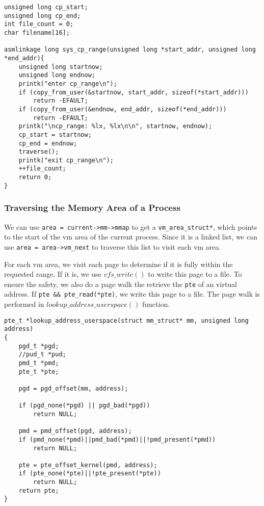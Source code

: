 \documentclass[11pt]{article}
\begin{document}
\begin{lstlisting}[style=CStyle]
unsigned long cp_start;
unsigned long cp_end;
int file_count = 0;
char filename[16];

asmlinkage long sys_cp_range(unsigned long *start_addr, unsigned long *end_addr){
    unsigned long startnow;
    unsigned long endnow;
    printk("enter cp_range\n");
    if (copy_from_user(&startnow, start_addr, sizeof(*start_addr)))
        return -EFAULT;
    if (copy_from_user(&endnow, end_addr, sizeof(*end_addr)))
        return -EFAULT;
    printk("\ncp_range: %lx, %lx\n\n", startnow, endnow);
    cp_start = startnow;
    cp_end = endnow;
    traverse();
    printk("exit cp_range\n");
    ++file_count;
    return 0;
}
\end{lstlisting}

\subsubsection{Traversing the Memory Area of a Process}
We can use \texttt{area = current->mm->mmap} to get a \texttt{vm\_area\_struct*}, which points to the start of the vm area of the current process. Since it is a linked list, we can use \texttt{area = area->vm\_next} to traverse this list to visit each vm area.

For each vm area, we visit each page to determine if it is fully within the requested range. If it is, we use $vfs\_write()$ to write this page to a file. To ensure the safety, we also do a page walk the retrieve the \texttt{pte} of an virtual address. If \texttt{pte \&\& pte\_read(*pte)}, we write this page to a file. The page walk is performed in $lookup\_address\_userspace()$ function.

\begin{lstlisting}[style=CStyle]
pte_t *lookup_address_userspace(struct mm_struct* mm, unsigned long address)
{
    pgd_t *pgd;
    //pud_t *pud;
    pmd_t *pmd;
    pte_t *pte;

    pgd = pgd_offset(mm, address);

    if (pgd_none(*pgd) || pgd_bad(*pgd))
        return NULL;
    
    pmd = pmd_offset(pgd, address);
    if (pmd_none(*pmd)||pmd_bad(*pmd)||!pmd_present(*pmd))
        return NULL;
    
    pte = pte_offset_kernel(pmd, address);
    if (pte_none(*pte)||!pte_present(*pte))
        return NULL;
    return pte;
}
\end{lstlisting}
\end{document}
